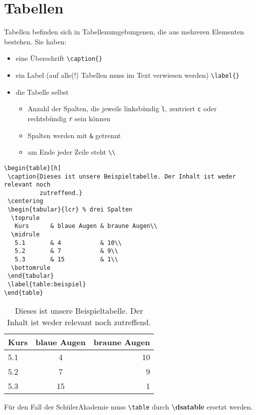 \section{Tabellen}
Tabellen befinden sich in Tabellenumgebungenen, die
aus mehreren Elementen bestehen. Sie haben:

\begin{itemize}
 \item eine Überschrift \lstinline$\caption{}$
 \item ein Label (auf alle(!) Tabellen muss im Text verwiesen werden)
       \lstinline$\label{}$
 \item die Tabelle selbst
 \begin{itemize}
  \item Anzahl der Spalten, die jeweils linksbündig \lstinline$l$, zentriert
        \lstinline$c$ oder rechtsbündig \lstinline$r$ sein können
  \item Spalten werden mit \lstinline$&$ getrennt
  \item am Ende jeder Zeile steht \lstinline$\\$
 \end{itemize}
\end{itemize}

\begin{lstlisting}
\begin{table}[h]
 \caption{Dieses ist unsere Beispieltabelle. Der Inhalt ist weder relevant noch
          zutreffend.}
 \centering
 \begin{tabular}{lcr} % drei Spalten
  \toprule
   Kurs      & blaue Augen & braune Augen\\
  \midrule
   5.1       & 4           & 10\\
   5.2       & 7           & 9\\
   5.3       & 15          & 1\\
  \bottomrule
 \end{tabular}
 \label{table:beispiel}
\end{table}
\end{lstlisting}

\begin{table}[h]
 \caption{Dieses ist unsere Beispieltabelle. Der Inhalt ist weder relevant noch
          zutreffend.}
 \centering
 \begin{tabular}{lcr} %
  \toprule
   Kurs      & blaue Augen & braune Augen\\
  \midrule
   5.1       & 4           & 10\\
   5.2       & 7           & 9\\
   5.3       & 15          & 1\\
  \bottomrule
 \end{tabular}
 \label{table:beispiel}
\end{table}

\danger Für den Fall der SchülerAkademie muss \lstinline$\table$ durch
        \textbf{\textbackslash dsatable} ersetzt werden.
